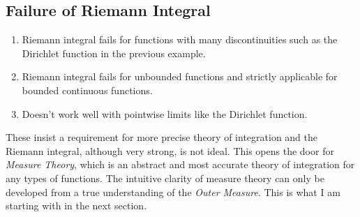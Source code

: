 \subsection{ Failure of Riemann Integral}
\begin{enumerate}
    \item Riemann integral fails for functions with many discontinuities such as the Dirichlet function in the previous example.
    \item Riemann integral fails for unbounded functions and strictly applicable for bounded continuous functions.
    \item  Doesn't work well with pointwise limits like the Dirichlet function.
\end{enumerate}
These insist a requirement for more precise theory of integration and the Riemann integral, although very strong, is not ideal. This opens the door for \textit{Measure Theory}, which is an abstract and most accurate theory of integration for any types of functions. The intuitive clarity of measure theory can only be developed from a true understanding of the \textit{Outer Measure}. This is what I am starting with in the next section. 